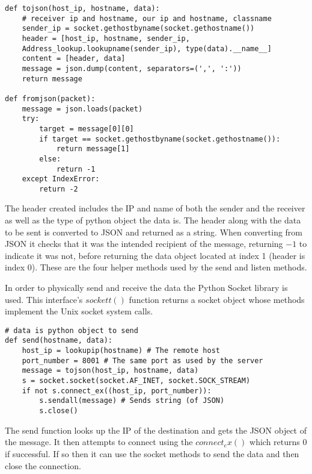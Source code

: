 \begin{lstlisting}
def tojson(host_ip, hostname, data):
    # receiver ip and hostname, our ip and hostname, classname
    sender_ip = socket.gethostbyname(socket.gethostname())
    header = [host_ip, hostname, sender_ip,
    Address_lookup.lookupname(sender_ip), type(data).__name__]
    content = [header, data]
    message = json.dump(content, separators=(',', ':'))
    return message

def fromjson(packet):
    message = json.loads(packet)
    try:
        target = message[0][0]
        if target == socket.gethostbyname(socket.gethostname()):
            return message[1]
        else:
            return -1
    except IndexError:
        return -2
\end{lstlisting}
The header created includes the IP and name of both the sender and the
receiver as well as the type of python object the data is. The header along
with the data to be sent is converted to JSON and returned as a string. When  converting from JSON it checks that it was the intended recipient of the
message, returning $-1$ to indicate it was not, before returning the data
object located at index 1 (header is index 0). These are the four helper
methods used by the send and listen methods.

In order to physically send and receive the data the Python Socket library
is used. This interface's $sockett()$ function returns a socket object whose
methods implement the Unix socket system calls.
\begin{lstlisting}
# data is python object to send
def send(hostname, data):
    host_ip = lookupip(hostname) # The remote host
    port_number = 8001 # The same port as used by the server
    message = tojson(host_ip, hostname, data)
    s = socket.socket(socket.AF_INET, socket.SOCK_STREAM)
    if not s.connect_ex((host_ip, port_number)):
        s.sendall(message) # Sends string (of JSON)
        s.close()
\end{lstlisting}
The send function looks up the IP of the destination and gets the JSON object
of the message. It then attempts to connect using the $connect_ex()$ which
returns 0 if successful. If so then it can use the socket methods to send the
data and then close the connection.

